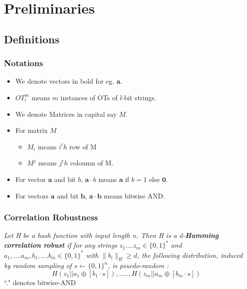 \documentclass[hyperref={pdfpagelabels=false}]{beamer}
\theoremstyle{remark}
\begin{document}
\section{Preliminaries}
\subsection{Definitions}

\begin{frame}
\frametitle{Notations}
\begin{itemize}
\item We denote vectors in bold for eg. $\mathbf{a}$.
\item $OT_l^m$ means $m$ instances of OTs of $l$-bit strings.
\item We denote Matrices in capital say $M$.
\item For matrix $M$ 
	\begin{itemize}
	\item $M_i$ means $i^th$ row of M
	\item $M^j$ means $j^th$ coloumn of M.
	\end{itemize}
\item For vector $\mathbf{a}$ and bit $b$, $\mathbf{a} \cdot b$ means $\mathbf{a}$ if $b=1$ else $\mathbf{0}$.
\item For vectors  $\mathbf{a}$ and bit $\mathbf{b}$, $\mathbf{a} \cdot \mathbf{b}$ means bitwise AND.
\end{itemize}

\end{frame}


\begin{frame}
\frametitle{Correlation Robustness}

\begin{definition}[1]
\textit{Let H be a hash function with input length n. Then H is a d-\textbf{Hamming correlation robust} if for any strings $z_1....z_m \in \{0,1\}^*$ and $a_1,....a_m,b_1,....b_m \in \{0,1\}^*$ with $\|b_i\|_H \geq d $, the following distribution, induced by random sampling of $s \longleftarrow \{0,1\}^n$, is psuedo-random :}
\begin{equation*}
H(z_1||a_1 \oplus [b_1 \cdot s]),.....,H(z_m||a_m \oplus [b_m \cdot s])
\end{equation*}
``." denotes bitwise-AND
\end{definition}
\end{frame}
\end{document}
